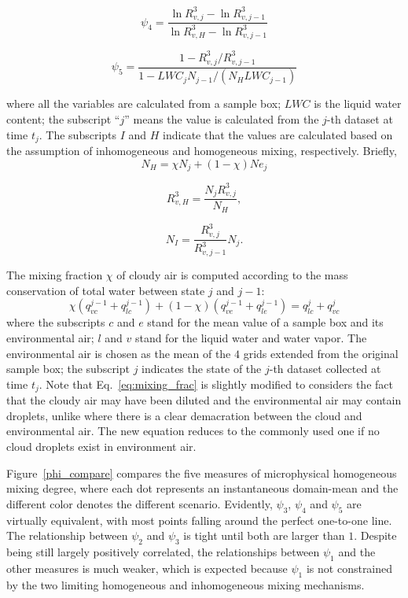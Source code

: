 \documentclass[draft,linenumbers]{agujournal}
\newcommand{\Eq}[1]{Eq.~\eqref{#1}}
\newcommand{\Fig}[1]{Figure~\ref{#1}}
\begin{document}
\begin{equation}
\psi_4 = \frac{\ln R_{v,j}^3 - \ln R_{v,j-1}^3}{\ln R_{v,H}^3 - \ln R_{v,j-1}^3}
\label{phi4}
\end{equation}

\begin{equation}
\psi_5 = \frac{1 - R_{v,j}^3/R_{v,j-1}^3}{1 - LWC_{j}N_{j-1}/(N_H LWC_{j-1})}
\label{phi5}
\end{equation}

where all the variables are calculated from a sample box; $LWC$ is the liquid water content; the subscript ``$j$'' means the value is calculated from the $j$-th dataset at time $t_j$. The subscripts $I$ and $H$ indicate that the values are calculated based on the assumption of inhomogeneous and homogeneous mixing, respectively. Briefly,
\begin{equation}
N_H = \chi N_j + (1 - \chi) Ne_j
\end{equation}

\begin{equation}
R_{v,H}^3 = \frac{N_jR_{v,j}^3}{N_H},
\end{equation}

\begin{equation}
N_I = \frac{R_{v,j}^3}{R_{v,j-1}^3}N_j.
\end{equation}

The mixing fraction $\chi$ of cloudy air is computed according to the mass conservation of total water between state $j$ and $j-1$:
\begin{equation}
\chi(q^{j-1}_{vc} + q^{j-1}_{lc}) + (1-\chi)(q^{j-1}_{ve} + q^{j-1}_{le}) = q^{j}_{lc} + q^{j}_{vc}
\label{eq:mixing_frac}
\end{equation}
where the subscripts $c$ and $e$ stand for the mean 
value of a sample box and its environmental air; $l$ and $v$ stand for the liquid 
water and water vapor. The environmental air is chosen as the mean of the $4$ 
grids extended from the original sample box; the subscript $j$ indicates the state of the $j$-th dataset 
collected at time $t_j$. Note that \Eq{eq:mixing_frac} is slightly modified to considers the fact that the cloudy air may have 
been diluted and the environmental air may contain droplets, 
{\color{green}unlike \citet{Lu2013a,Lu2013b,Lu2014} where there is a clear demacration between the cloud and environmental air. The new equation reduces to the commonly used one if no cloud droplets exist in environment air.}

\Fig{phi_compare} compares the five measures of microphysical homogeneous mixing degree, where each dot represents an 
instantaneous domain-mean and the different color denotes the different scenario.
Evidently, $\psi_3$, $\psi_4$ and $\psi_5$ are virtually equivalent, with most points falling around the perfect one-to-one line. The relationship between $\psi_2$ and $\psi_3$ is tight until both are larger than $1$. Despite being still largely positively correlated, the relationships between $\psi_1$ and {\color{green}the other measures is much weaker, which is expected because $\psi_1$ is not constrained by the two limiting homogeneous and inhomogeneous mixing mechanisms.} 
\end{document}
